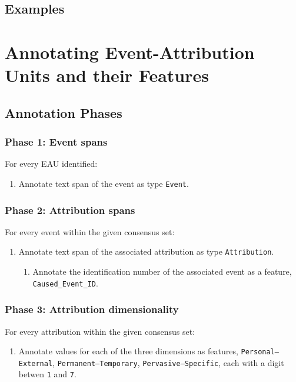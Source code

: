 \documentclass[a4paper,12pt]{article}
\begin{document}
    \subsection{Examples}

\pagebreak
\section{Annotating Event-Attribution Units and their Features}

    \subsection{Annotation Phases}
    \subsubsection{Phase 1: Event spans}
    For every EAU identified:
        \begin{enumerate}
            \item Annotate text span of the event as type \texttt{Event}.
        \end{enumerate}

    \subsubsection{Phase 2: Attribution spans}
    For every event within the given consensus set:
        \begin{enumerate}
            \item Annotate text span of the associated attribution as type \texttt{Attribution}.
                \begin{enumerate}
                    \item Annotate the identification number of the associated event as a feature, \texttt{Caused\_Event\_ID}.
                \end{enumerate}
        \end{enumerate}
    \subsubsection{Phase 3: Attribution dimensionality}
    For every attribution within the given consensus set:
        \begin{enumerate}
            \item Annotate values for each of the three dimensions as features, \texttt{Personal--External}, \texttt{Permanent--Temporary}, \texttt{Pervasive--Specific}, each with a digit betwen \texttt{1} and \texttt{7}.
        \end{enumerate}
\end{document}
